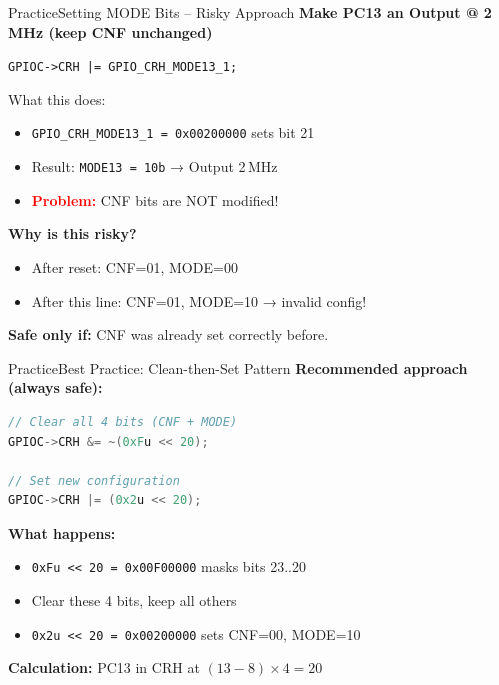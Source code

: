 \documentclass{beamer}
\begin{document}
\begin{frame}{Practice}{Setting MODE Bits – Risky Approach}
	\textbf{Make PC13 an Output @ 2\,MHz (keep CNF unchanged)}
	\medskip
	
	\texttt{GPIOC->CRH |= GPIO\_CRH\_MODE13\_1;}
	
	\medskip
	What this does:
	\begin{itemize}
		\item \texttt{GPIO\_CRH\_MODE13\_1 = 0x00200000} sets bit 21
		\item Result: \texttt{MODE13 = 10b} → Output 2\,MHz
		\item \textcolor{red}{\textbf{Problem:}} CNF bits are NOT modified!
	\end{itemize}
	
	\textbf{Why is this risky?}
	\begin{itemize}
		\item After reset: CNF=01, MODE=00
		\item After this line: CNF=01, MODE=10 → invalid config!
	\end{itemize}
	
	\textbf{Safe only if:} CNF was already set correctly before.
\end{frame}
\begin{frame}[fragile]{Practice}{Best Practice: Clean-then-Set Pattern}
	\textbf{Recommended approach (always safe):}
	\begin{lstlisting}[language=C, basicstyle=\ttfamily\small]
// Clear all 4 bits (CNF + MODE)
GPIOC->CRH &= ~(0xFu << 20);
		
// Set new configuration
GPIOC->CRH |= (0x2u << 20);
	\end{lstlisting}
	
	\textbf{What happens:}
	\begin{itemize}
		\item \texttt{0xFu << 20 = 0x00F00000} masks bits 23..20
		\item Clear these 4 bits, keep all others
		\item \texttt{0x2u << 20 = 0x00200000} sets CNF=00, MODE=10
	\end{itemize}
	
	\textbf{Calculation:} PC13 in CRH at $(13-8) \times 4 = 20$
\end{frame}
\end{document}
